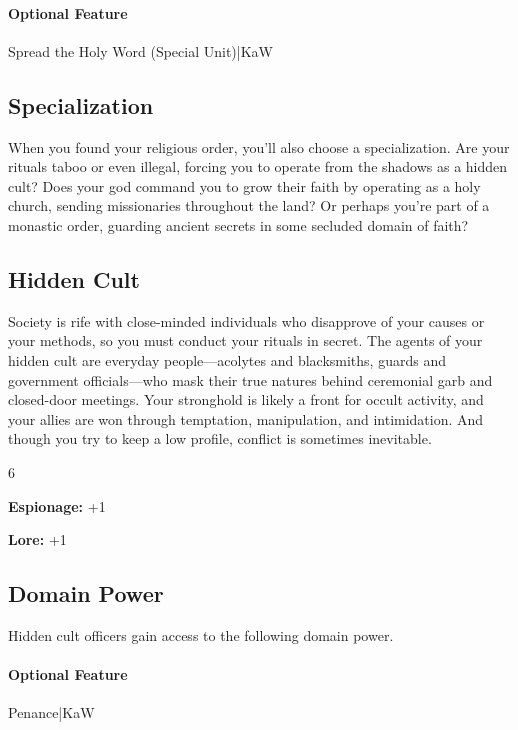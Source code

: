 \documentclass[10pt,a4paper,twoside,bg=print,twocolumn,openany,nodeprecatedcode]{dndbook}
\begin{document}
\paragraph{Optional Feature}
Spread the Holy Word (Special Unit)|KaW

\subsection{Specialization}
When you found your religious order, you'll also choose a specialization. Are your rituals taboo or even illegal, forcing you to operate from the shadows as a hidden cult? Does your god command you to grow their faith by operating as a holy church, sending missionaries throughout the land? Or perhaps you're part of a monastic order, guarding ancient secrets in some secluded domain of faith?

\subsection{Hidden Cult}
Society is rife with close-minded individuals who disapprove of your causes or your methods, so you must conduct your rituals in secret. The agents of your hidden cult are everyday people—acolytes and blacksmiths, guards and government officials—who mask their true natures behind ceremonial garb and closed-door meetings. Your stronghold is likely a front for occult activity, and your allies are won through temptation, manipulation, and intimidation. And though you try to keep a low profile, conflict is sometimes inevitable.

{\par \vspace { 9pt plus 3pt minus 3pt } \noindent  {} \nopagebreak }

\begin{itemize}
\begin{multicols}{6}
\item \textbf{Espionage:} +1
\item \textbf{Lore:} +1
\end{multicols}

\end{itemize}

\subsection{Domain Power}
Hidden cult officers gain access to the following domain power.

\paragraph{Optional Feature}
Penance|KaW
\end{document}
